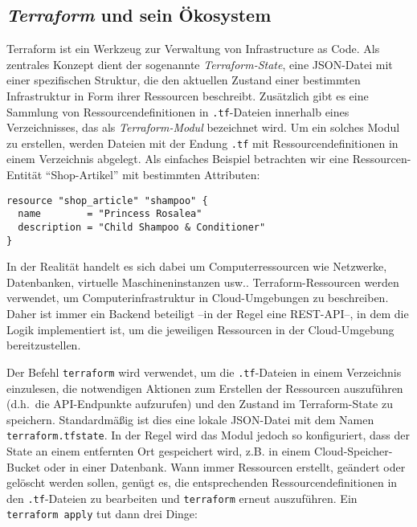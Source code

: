 \documentclass[paper=a4,11pt,numbers=noenddot]{article}
\begin{document}
\subsection{\emph{Terraform} und sein Ökosystem}
\label{subsec:terr-tool-ecosyst}

Terraform ist ein Werkzeug zur Verwaltung von Infrastructure as Code. Als zentrales Konzept dient der sogenannte \emph{Terraform-State}, eine JSON-Datei mit einer spezifischen Struktur, die den aktuellen Zustand einer bestimmten Infrastruktur in Form ihrer Ressourcen beschreibt. Zusätzlich gibt es eine Sammlung von Ressourcendefinitionen in \verb'.tf'-Dateien innerhalb eines Verzeichnisses, das als \emph{Terraform-Modul} bezeichnet wird.
Um ein solches Modul zu erstellen, werden Dateien mit der Endung \verb'.tf' mit Ressourcendefinitionen in einem Verzeichnis abgelegt.
Als einfaches Beispiel betrachten wir eine Ressourcen-Entität ``Shop-Artikel'' mit bestimmten Attributen:

\begin{lstlisting}
resource "shop_article" "shampoo" {
  name        = "Princess Rosalea"
  description = "Child Shampoo & Conditioner"
}
\end{lstlisting}

In der Realität handelt es sich dabei um Computerressourcen wie Netzwerke, Datenbanken, virtuelle Maschineninstanzen usw.. Terraform-Ressourcen werden verwendet, um Computerinfrastruktur in Cloud-Umgebungen zu beschreiben. Daher ist immer ein Backend beteiligt –in der Regel eine REST-API–, in dem die Logik implementiert ist, um die jeweiligen Ressourcen in der Cloud-Umgebung bereitzustellen.

Der Befehl \verb'terraform' wird verwendet, um die \verb'.tf'-Dateien in einem Verzeichnis einzulesen, die notwendigen Aktionen zum Erstellen der Ressourcen auszuführen (d.h.\ die API-Endpunkte aufzurufen) und den Zustand im Terraform-State zu speichern. Standardmäßig ist dies eine lokale JSON-Datei mit dem Namen \verb'terraform.tfstate'. In der Regel wird das Modul jedoch so konfiguriert, dass der State an einem entfernten Ort gespeichert wird, z.B. in einem Cloud-Speicher-Bucket oder in einer Datenbank. Wann immer Ressourcen erstellt, geändert oder gelöscht werden sollen, genügt es, die entsprechenden Ressourcendefinitionen in den \verb'.tf'-Dateien zu bearbeiten und \verb'terraform' erneut auszuführen. Ein \verb'terraform apply' tut dann drei Dinge:
\end{document}
